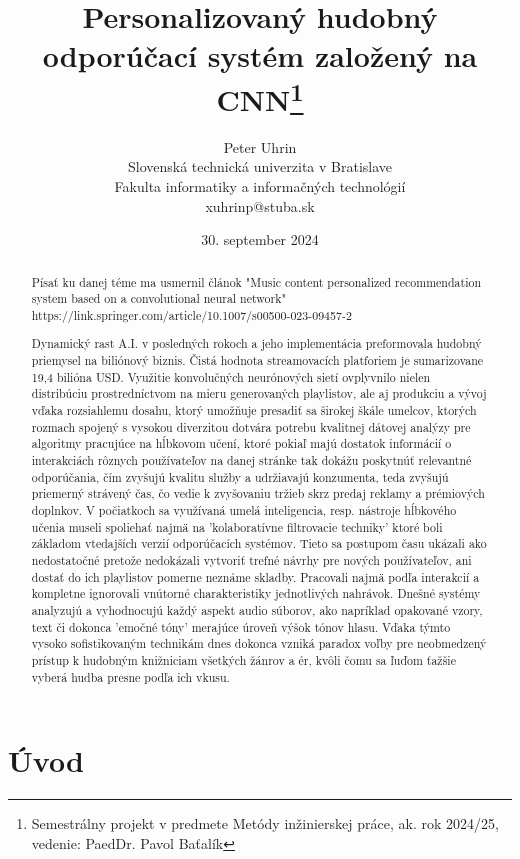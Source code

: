 \documentclass[10pt,twoside,slovak,a4paper, colorinlistoftodos]{article}
\title{Personalizovaný hudobný odporúčací systém založený na CNN\thanks{Semestrálny projekt v predmete Metódy inžinierskej práce, ak. rok 2024/25, vedenie: PaedDr. Pavol Baťalík}}
\author{Peter Uhrin\\[2pt]
	{\small Slovenská technická univerzita v Bratislave}\\
	{\small Fakulta informatiky a informačných technológií}\\
	{\small {xuhrinp@stuba.sk}}}
\date{\small 30. september 2024}
\begin{document}
\maketitle

\begin{abstract}

Písať ku danej téme ma usmernil článok "Music content personalized recommendation system based on a convolutional neural network" 
https://link.springer.com/article/10.1007/s00500-023-09457-2

Dynamický rast A.I. v posledných rokoch a jeho implementácia preformovala hudobný priemysel na biliónový biznis. Čistá hodnota streamovacích platforiem je sumarizovane 19,4 bilióna USD. Využitie konvolučných neurónových sietí ovplyvnilo nielen distribúciu prostredníctvom na mieru generovaných playlistov, ale aj produkciu a vývoj vďaka rozsiahlemu dosahu, ktorý umožňuje presadiť sa širokej škále umelcov, ktorých rozmach spojený s vysokou diverzitou dotvára potrebu kvalitnej dátovej analýzy pre algoritmy pracujúce na hĺbkovom učení, ktoré pokiaľ majú dostatok informácií o interakciách rôznych používateľov na danej stránke tak dokážu poskytnúť relevantné odporúčania, čím zvyšujú kvalitu služby a udržiavajú konzumenta, teda zvyšujú priemerný strávený čas, čo vedie k zvyšovaniu tržieb skrz predaj reklamy a prémiových doplnkov. V počiatkoch sa využívaná umelá inteligencia, resp. nástroje hĺbkového učenia museli spoliehať najmä na 'kolaboratívne filtrovacie techniky' ktoré boli základom vtedajších verzií odporúčacích systémov. Tieto sa postupom času ukázali ako nedostatočné pretože nedokázali vytvoriť trefné návrhy pre nových používateľov, ani dostať do ich playlistov pomerne neznáme skladby. Pracovali najmä podľa interakcií a kompletne ignorovali vnútorné charakteristiky jednotlivých nahrávok. Dnešné systémy analyzujú a vyhodnocujú každý aspekt audio súborov, ako napríklad opakované vzory, text či dokonca 'emočné tóny' merajúce úroveň výšok tónov hlasu. Vďaka týmto vysoko sofistikovaným technikám dnes dokonca vzniká paradox voľby pre neobmedzený prístup k hudobným knižniciam všetkých žánrov a ér, kvôli čomu sa ľuďom ťažšie vyberá hudba presne podľa ich vkusu.

\end{abstract}



\section{Úvod}
\end{document}
